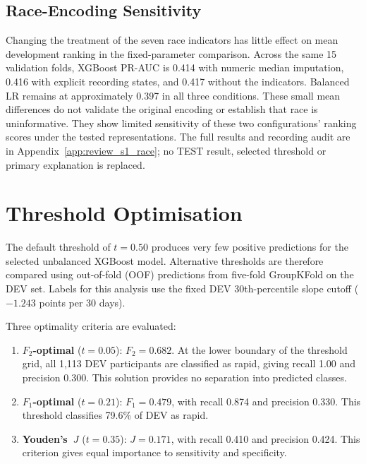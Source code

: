\subsection{Race-Encoding Sensitivity}
\label{subsec:results_race_sensitivity}

Changing the treatment of the seven race indicators has little effect on mean development ranking in the fixed-parameter comparison. Across the same 15 validation folds, XGBoost PR-AUC is 0.414 with numeric median imputation, 0.416 with explicit recording states, and 0.417 without the indicators. Balanced LR remains at approximately 0.397 in all three conditions. These small mean differences do not validate the original encoding or establish that race is uninformative. They show limited sensitivity of these two configurations' ranking scores under the tested representations. The full results and recording audit are in Appendix~\ref{app:review_s1_race}; no TEST result, selected threshold or primary explanation is replaced.


\section{Threshold Optimisation}
\label{sec:results_threshold_xgb}

The default threshold of $t\!=\!0.50$ produces very few positive predictions for the selected unbalanced XGBoost model. Alternative thresholds are therefore compared using out-of-fold (\gls{OOF}) predictions from five-fold GroupKFold on the DEV set. Labels for this analysis use the fixed DEV 30th-percentile slope cutoff ($-1.243$ points per 30 days).

Three optimality criteria are evaluated:
\begin{enumerate}
  \item \textbf{$F_2$-optimal} ($t\!=\!0.05$): $F_2=0.682$. At the lower boundary of the threshold grid, all 1,113 DEV participants are classified as rapid, giving recall 1.00 and precision 0.300. This solution provides no separation into predicted classes.
  \item \textbf{$F_1$-optimal} ($t\!=\!0.21$): $F_1=0.479$, with recall 0.874 and precision 0.330. This threshold classifies 79.6\% of DEV as rapid.
  \item \textbf{Youden's~$J$} ($t\!=\!0.35$): $J=0.171$, with recall 0.410 and precision 0.424. This criterion gives equal importance to sensitivity and specificity.
\end{enumerate}

